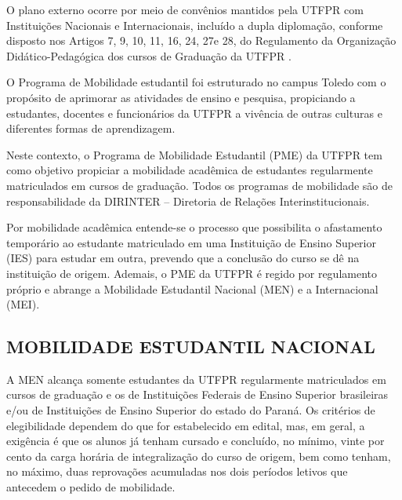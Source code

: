 O plano externo ocorre por meio de convênios mantidos pela UTFPR com Instituições Nacionais e Internacionais, incluído a dupla diplomação, conforme disposto nos Artigos 7\textordmasculine, 9\textordmasculine, 10\textordmasculine, 11\textordmasculine, 16\textordmasculine, 24\textordmasculine, 27\textordmasculine e 28\textordmasculine, do Regulamento da Organização Didático-Pedagógica dos cursos de Graduação da UTFPR \cite{rodp}.

O Programa de Mobilidade estudantil foi estruturado no campus Toledo com o propósito de aprimorar as atividades de ensino e pesquisa, propiciando a estudantes, docentes e funcionários da UTFPR a vivência de outras culturas e diferentes formas de aprendizagem.

Neste contexto, o Programa de Mobilidade Estudantil (PME) da UTFPR tem como objetivo propiciar a mobilidade acadêmica de estudantes regularmente matriculados em cursos de graduação. Todos os programas de mobilidade são de responsabilidade da DIRINTER – Diretoria de Relações Interinstitucionais.


Por mobilidade acadêmica entende-se o processo que possibilita o afastamento temporário ao estudante matriculado em uma Instituição de Ensino Superior (IES) para estudar em outra, prevendo que a conclusão do curso se dê na instituição de origem. Ademais, o PME da UTFPR é regido por regulamento próprio e abrange a Mobilidade Estudantil Nacional (MEN) e a Internacional (MEI).


\subsection{MOBILIDADE ESTUDANTIL NACIONAL}

A MEN alcança somente estudantes da UTFPR regularmente matriculados em cursos de graduação e os de Instituições Federais de Ensino Superior brasileiras e/ou de Instituições de Ensino Superior do estado do Paraná. Os critérios de elegibilidade dependem do que for estabelecido em edital, mas, em geral, a exigência é que os alunos já tenham cursado e concluído, no mínimo, vinte por cento da carga horária de integralização do curso de origem, bem como tenham, no máximo, duas reprovações acumuladas nos dois períodos letivos que antecedem o pedido de mobilidade.
 
